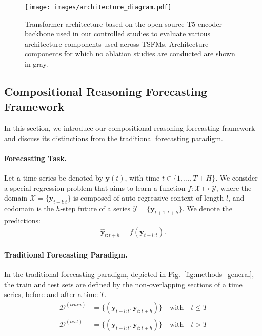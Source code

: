 
\begin{figure}[t]
    \centering
    \texttt{[image: images/architecture\_diagram.pdf]}
    \caption{Transformer architecture based on the open-source T5 encoder backbone used in our controlled studies to evaluate various architecture components used across TSFMs. Architecture components for which no ablation studies are conducted are shown in gray.
    }
    \label{fig:t5_model_architecture}
\end{figure}

\subsection{Compositional Reasoning Forecasting Framework}
\label{section:compositional_reasoning}

In this section, we introduce our compositional reasoning forecasting framework and discuss its distinctions from the traditional forecasting paradigm.

\paragraph{Forecasting Task.} 
Let a time series be denoted by $\mathbf{y}(t)$, with time $t \in \{1,...,T+H\}$. We consider a special regression problem that aims to learn a function $f: \mathcal{X} \mapsto \mathcal{Y}$, where the domain $\mathcal{X}=\{\textbf{y}_{t-l:t}\}$ is composed of auto-regressive context of length $l$, and codomain is the $h$-step future of a series $\mathcal{Y}=\{\textbf{y}_{t+1:t+h} \}$. We denote the predictions:
\begin{align}
    \hat{\textbf{y}}_{t:t+h} = f(\textbf{y}_{t-l:t}).
\end{align}

\paragraph{Traditional Forecasting Paradigm.} 

In the traditional forecasting paradigm, depicted in Fig.~\ref{fig:methods_general}, the train and test sets are defined by the non-overlapping sections of a time series, before and after a time $T$.
\begin{align}
    \mathcal{D}^{(train)} &= \{(\textbf{y}_{t-l:t}, \textbf{y}_{t:t+h})\}
    \quad \mathrm{with} \quad t \leq T \\
    \mathcal{D}^{(test)} &= \{(\textbf{y}_{t-l:t}, \textbf{y}_{t:t+h})\}
    \quad \mathrm{with} \quad t > T    
\end{align}

